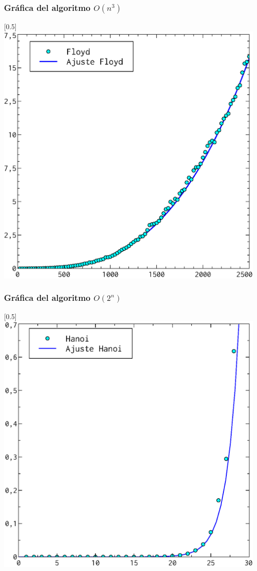 \documentclass[compress]{beamer}
\begin{document}
\begin{frame}
\frametitle{Gráfica del algoritmo $O(n^3)$}
	\begin{center}
\scalebox{0.53}[0.5]{
    \includegraphics[]{n3_ajuste.eps}
}
\end{center}
\end{frame}
\begin{frame}
\frametitle{Gráfica del algoritmo $O(2^n)$}
	\begin{center}
\scalebox{0.53}[0.5]{
    \includegraphics[]{2n_ajuste.eps}
}
\end{center}
\end{frame}
\end{document}
